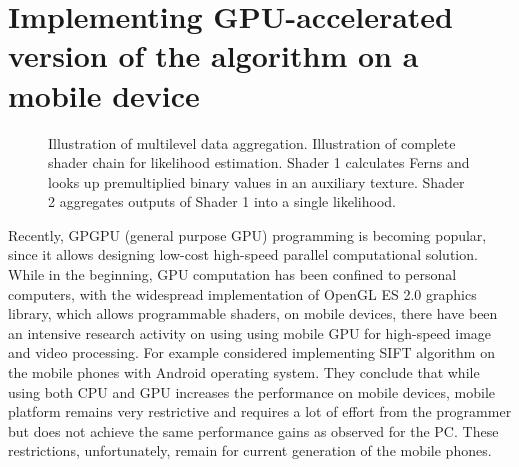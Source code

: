 \documentclass[10pt,twocolumn, a4paper]{article}
\begin{document}
\section{Implementing GPU-accelerated version of the algorithm on a mobile device}
\label{implementation}
\begin{figure}[t]

    \centering


    \caption{ \protect {} Illustration of multilevel data aggregation.  \protect{} Illustration of complete shader chain for likelihood estimation. Shader 1 calculates Ferns and looks up premultiplied binary values in an auxiliary texture. Shader 2 aggregates outputs of Shader 1 into a single likelihood.}
\label{shaders}
\end{figure}
Recently, GPGPU (general purpose GPU) programming is becoming popular, since it allows designing low-cost high-speed parallel computational solution. While in the beginning, GPU computation has been confined to personal computers, with the widespread implementation of OpenGL ES 2.0 graphics library, which allows programmable shaders, on mobile devices, there have been an intensive research activity on using using mobile GPU for high-speed image and video processing. For example \cite{gpusift1} considered implementing SIFT algorithm on the mobile phones with Android operating system. They conclude that while using both CPU and GPU increases the performance on mobile devices, mobile platform remains very restrictive and requires a lot of effort from the programmer but does not achieve the same performance gains as observed for the PC. These restrictions, unfortunately, remain for current generation of the mobile phones.
\end{document}
